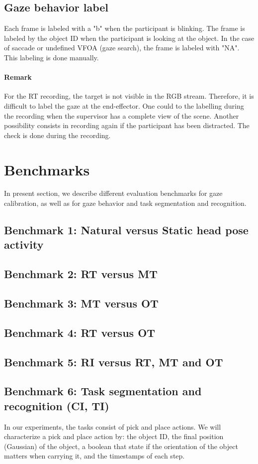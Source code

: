 \documentclass[11pt,a4paper]{article}
\begin{document}
\subsection{Gaze behavior label}
Each frame is labeled with a "b" when the participant is blinking. The frame is labeled by the object ID when the participant is looking at the object. In the case of saccade or undefined VFOA (gaze search), the frame is labeled with "NA". This labeling is done manually. 
\paragraph{Remark}
For the RT recording, the target is not visible in the RGB stream. Therefore, it is difficult to label the gaze at the end-effector. One could to the labelling during the recording when the supervisor has a complete view of the scene. Another possibility consists in recording again if the participant has been distracted. The check is done during the recording.

\section{Benchmarks}
\label{Benchmarks}
In present section, we describe different evaluation benchmarks for gaze calibration, as well as for gaze behavior and task segmentation and recognition.
\subsection{Benchmark 1: Natural versus Static head pose activity}
\subsection{Benchmark 2: RT versus MT} 
\subsection{Benchmark 3: MT versus OT}
\subsection{Benchmark 4: RT versus OT}
\subsection{Benchmark 5: RI versus RT, MT and OT}
\subsection{Benchmark 6: Task segmentation and recognition (CI, TI)}
In our experiments, the tasks consist of pick and place actions. We will characterize a pick and place action by: the object ID, the final position (Gaussian) of the object, a boolean that state if the orientation of the object matters when carrying it, and the timestamps of each step.
\end{document}
